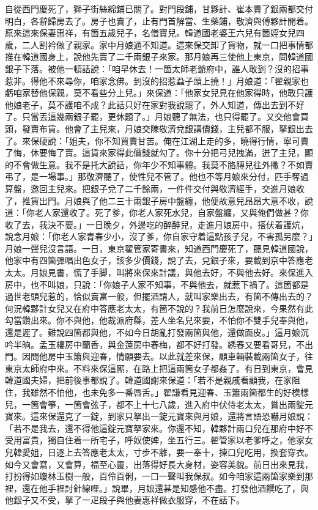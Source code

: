 自從西門慶死了，獅子街絲綿鋪已關了。對門段鋪，甘夥計、崔本賣了銀兩都交付明白，各辭歸房去了。房子也賣了，止有門首解當、生藥鋪，敬濟與傅夥計開着。原來這來保妻惠祥，有箇五歲兒子，名僧寶兒。韓道國老婆王六兒有箇姪女兒四歲，二人割衿做了親家。家中月娘通不知道。這來保交卸了貨物，就一口把事情都推在韓道國身上，說他先賣了二千兩銀子來家。{}那月娘再三使他上東京，問韓道國銀子下落。被他一頓話說：「咱早休去！一箇太師老爺府中，誰人敢到？沒的招事惹非。得他不來尋你，咱家念佛。到沒的招惹蝨子頭上撓！」月娘道：「翟親家也虧咱家替他保親，莫不看些分上兒。」來保道：「他家女兒見在他家得時，他敢只護他娘老子，莫不護咱不成？{}此話只好在家對我說罷了，外人知道，傳出去到不好了。只當丟這幾兩銀子罷，更休題了。」月娘聽了無法，也只得罷了。又交他會買頭，發賣布貨。他會了主兒來，月娘交陳敬濟兌銀講價錢，主兒都不服，拏銀出去了。來保硬說：「姐夫，你不知買賣甘苦。俺在江湖上走的多，曉得行情，寧可賣了悔，休要悔了賣。這貨來家得此價錢就勾了。你十分把弓兒拽滿，迸了主兒，顯的不會做生意。我不是托大說話，你年少不知事體。我莫不胳膊兒往外撇？不如賣弔了，是一場事。」那敬濟聽了，使性兒不管了。他也不等月娘來分付，匹手奪過算盤，邀回主兒來。把銀子兌了二千餘兩，一件件交付與敬濟經手，交進月娘收了，推貨出門。月娘與了他二三十兩銀子房中盤纏，他便故意兒昂昂大意不收，說道：「你老人家還收了。死了爹，你老人家死水兒，自家盤纏，又與俺們做甚？你收了去，我決不要。」一日晚夕，外邊吃的醉醉兒，走進月娘房中，搭伏着護炕，說念月娘：「你老人家青春少小，沒了爹，你自家守着這點孩子兒，不害孤另麼？」月娘一聲兒沒言語。{}一日，東京翟管家寄書來，知道西門慶死了，聽見韓道國說，他家中有四箇彈唱出色女子，該多少價錢，說了去，兌銀子來，要載到京中答應老太太。月娘見書，慌了手脚，叫將來保來計議，與他去好，不與他去好。來保進入房中，也不叫娘，只說：「你娘子人家不知事，不與他去，就惹下禍了。這箇都是過世老頭兒惹的，恰似賣富一般，但擺酒請人，就叫家樂出去，有箇不傳出去的？何況韓夥計女兒又在府中答應老太太，有箇不說的？我前日怎麼說來，今果然有此勾當鑽出來。{}你不與他，他裁派府縣，差人坐名兒來要，不怕你不雙手兒奉與他，還是遲了。難說四箇都與他，不如今日胡亂打發兩箇與他，還做面皮。」這月娘沉吟半晌。孟玉樓房中蘭香，與金蓮房中春梅，都不好打發。綉春又要看哥兒，不出門。因問他房中玉簫與迎春，情願要去。以此就差來保，顧車輛裝載兩箇女子，往東京太師府中來。不料來保這厮，在路上把這兩箇女子都姦了。有日到東京，會見韓道國夫婦，把前後事都說了。韓道國謝來保道：「若不是親戚看顧我，在家阻住，我雖然不怕他，也未免多一番唇舌。」翟謙看見迎春、玉簫兩箇都生的好模樣兒，一箇會箏，一箇會弦子，都不上十七八歲，進入府中伏侍老太太，賞出兩錠元寶來。這來保還克了一錠，到家只拏出一錠元寶來與月娘，還將言語恐嚇月娘說：「若不是我去，還不得他這錠元寶拏家來。你還不知，韓夥計兩口兒在那府中好不受用富貴，獨自住着一所宅子，呼奴使婢，坐五行三。翟管家以老爹呼之，他家女兒韓愛姐，日逐上去答應老太太，寸步不離，要一奉十，揀口兒吃用，換套穿衣。如今又會寫，又會算，福至心靈，出落得好長大身材，姿容美貌。前日出來見我，打扮得如瓊林玉樹一般，百伶百俐，一口一聲叫我保叔。如今咱家這兩箇家樂到那裡，還在他手裡討針線哩。」說畢，月娘還甚是知感他不盡。{}打發他酒饌吃了，與他銀子又不受，拏了一疋段子與他妻惠祥做衣服穿，不在話下。


